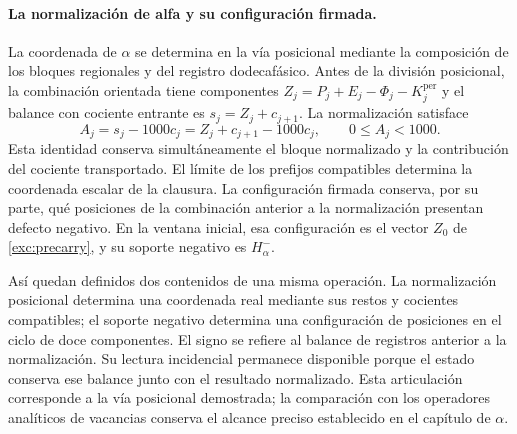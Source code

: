 \paragraph{La normalización de alfa y su configuración firmada.}
\label{inc-ampl-clausura}
La coordenada de $\alpha$ se determina en la vía posicional mediante la
composición de los bloques regionales y del registro dodecafásico. Antes
de la división posicional, la combinación orientada tiene componentes
$Z_j=P_j+E_j-\Phi_j-K_j^{\mathrm{per}}$ y el balance con cociente entrante
es $s_j=Z_j+c_{j+1}$. La normalización satisface
\begin{equation}
 A_j=s_j-1000c_j=Z_j+c_{j+1}-1000c_j,\qquad 0\leq A_j<1000.
 \label{inc-ampl-normalizacion}
\end{equation}
Esta identidad conserva simultáneamente el bloque normalizado y la
contribución del cociente transportado. El límite de los prefijos
compatibles determina la coordenada escalar de la clausura. La
configuración firmada conserva, por su parte, qué posiciones de la
combinación anterior a la normalización presentan defecto negativo.
En la ventana inicial, esa configuración es el vector $Z_0$ de
\eqref{exc:precarry}, y su soporte negativo es $H^-_\alpha$.

Así quedan definidos dos contenidos de una misma operación. La
normalización posicional determina una coordenada real mediante sus
restos y cocientes compatibles; el soporte negativo determina una
configuración de posiciones en el ciclo de doce componentes. El signo se
refiere al balance de registros anterior a la normalización. Su lectura
incidencial permanece disponible porque el estado conserva ese balance
junto con el resultado normalizado. Esta articulación corresponde a la
vía posicional demostrada; la comparación con los operadores analíticos
de vacancias conserva el alcance preciso establecido en el capítulo de
$\alpha$.
